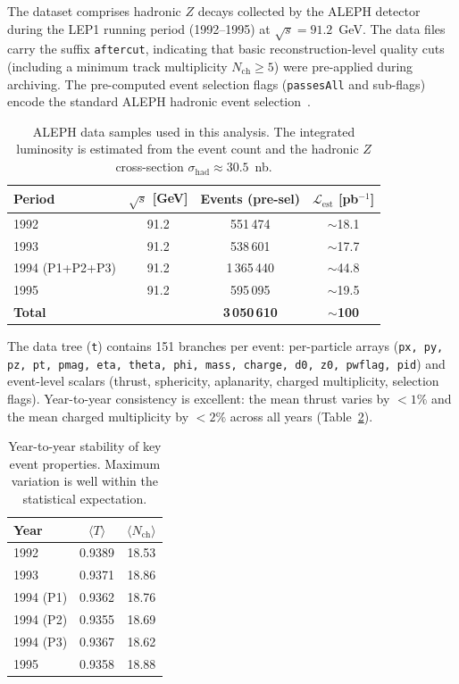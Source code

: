 \documentclass[11pt,a4paper]{article}
\begin{document}
The dataset comprises hadronic $Z$ decays collected by the ALEPH
detector~\cite{ALEPH:1995aqm} during the LEP1 running period
(1992--1995) at $\sqrt{s} = 91.2$~GeV.  The data files carry the
suffix \texttt{aftercut}, indicating that basic reconstruction-level
quality cuts (including a minimum track multiplicity $N_\text{ch}
\ge 5$) were pre-applied during archiving.  The pre-computed event
selection flags (\texttt{passesAll} and sub-flags) encode the standard
ALEPH hadronic event selection~\cite{ALEPH:1998vtv,ALEPH:1999rgl}.

\begin{table}[htbp]
\centering
\caption{ALEPH data samples used in this analysis.  The integrated
  luminosity is estimated from the event count and the hadronic
  $Z$ cross-section $\sigma_\text{had} \approx 30.5$~nb.}
\label{tbl:data}
\begin{tabular}{lccc}
\toprule
Period & $\sqrt{s}$ [GeV] & Events (pre-sel) &
  $\mathcal{L}_\text{est}$ [pb$^{-1}$] \\
\midrule
1992 & 91.2 & 551\,474 & $\sim$18.1 \\
1993 & 91.2 & 538\,601 & $\sim$17.7 \\
1994 (P1+P2+P3) & 91.2 & 1\,365\,440 & $\sim$44.8 \\
1995 & 91.2 & 595\,095 & $\sim$19.5 \\
\midrule
\textbf{Total} & & \textbf{3\,050\,610} & $\sim$\textbf{100} \\
\bottomrule
\end{tabular}
\end{table}

The data tree (\texttt{t}) contains 151 branches per event: per-particle
arrays (\texttt{px, py, pz, pt, pmag, eta, theta, phi, mass, charge,
d0, z0, pwflag, pid}) and event-level scalars (thrust, sphericity,
aplanarity, charged multiplicity, selection flags).  Year-to-year
consistency is excellent: the mean thrust varies by $<\!1\%$ and the
mean charged multiplicity by $<\!2\%$ across all years
(Table~\ref{tbl:year-stability}).

\begin{table}[htbp]
\centering
\caption{Year-to-year stability of key event properties.  Maximum
  variation is well within the statistical expectation.}
\label{tbl:year-stability}
\begin{tabular}{lcc}
\toprule
Year & $\langle T \rangle$ & $\langle N_\text{ch} \rangle$ \\
\midrule
1992 & 0.9389 & 18.53 \\
1993 & 0.9371 & 18.86 \\
1994 (P1) & 0.9362 & 18.76 \\
1994 (P2) & 0.9355 & 18.69 \\
1994 (P3) & 0.9367 & 18.62 \\
1995 & 0.9358 & 18.88 \\
\bottomrule
\end{tabular}
\end{table}
\end{document}

